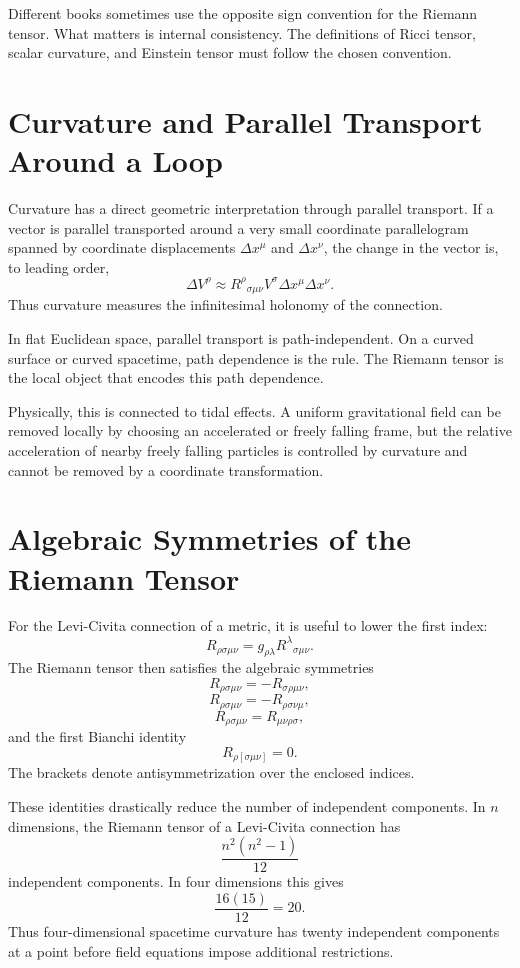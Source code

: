 Different books sometimes use the opposite sign convention for the Riemann
tensor. What matters is internal consistency. The definitions of Ricci tensor,
scalar curvature, and Einstein tensor must follow the chosen convention.

\clearpage

\section{Curvature and Parallel Transport Around a Loop}

Curvature has a direct geometric interpretation through parallel transport. If a
vector is parallel transported around a very small coordinate parallelogram
spanned by coordinate displacements \(\Delta x^\mu\) and \(\Delta x^\nu\), the
change in the vector is, to leading order,
\[
\Delta V^\rho
\approx
R^\rho{}_{\sigma\mu\nu}V^\sigma
\Delta x^\mu\Delta x^\nu.
\]
Thus curvature measures the infinitesimal holonomy of the connection.

In flat Euclidean space, parallel transport is path-independent. On a curved
surface or curved spacetime, path dependence is the rule. The Riemann tensor is
the local object that encodes this path dependence.

Physically, this is connected to tidal effects. A uniform gravitational field
can be removed locally by choosing an accelerated or freely falling frame, but
the relative acceleration of nearby freely falling particles is controlled by
curvature and cannot be removed by a coordinate transformation.

\clearpage

\section{Algebraic Symmetries of the Riemann Tensor}

For the Levi-Civita connection of a metric, it is useful to lower the first
index:
\[
R_{\rho\sigma\mu\nu}=g_{\rho\lambda}R^\lambda{}_{\sigma\mu\nu}.
\]
The Riemann tensor then satisfies the algebraic symmetries
\[
R_{\rho\sigma\mu\nu}=-R_{\sigma\rho\mu\nu},
\]
\[
R_{\rho\sigma\mu\nu}=-R_{\rho\sigma\nu\mu},
\]
\[
R_{\rho\sigma\mu\nu}=R_{\mu\nu\rho\sigma},
\]
and the first Bianchi identity
\[
R_{\rho[\sigma\mu\nu]}=0.
\]
The brackets denote antisymmetrization over the enclosed indices.

These identities drastically reduce the number of independent components. In
\(n\) dimensions, the Riemann tensor of a Levi-Civita connection has
\[
\frac{n^2(n^2-1)}{12}
\]
independent components. In four dimensions this gives
\[
\frac{16(15)}{12}=20.
\]
Thus four-dimensional spacetime curvature has twenty independent components at
a point before field equations impose additional restrictions.

